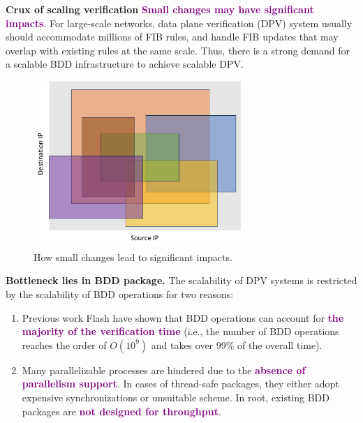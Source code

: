 \documentclass[final]{beamer}
\newcommand{\efsz}[1]{\textcolor{purple}{\textbf{#1}}}
\newlength{\colwidthB}
\begin{document}
\begin{frame}[t]
\begin{columns}
\begin{column}[T]{\colwidthB}
\begin{block}{\Large{\textbf{Crux of scaling verification}}}
    \efsz{Small changes may have significant impacts}. For large-scale
    networks, data plane verification (DPV) system usually should accommodate
    millions of FIB rules, and handle FIB updates that may overlap with existing rules
    at the same scale. Thus, there is a strong demand for a scalable BDD infrastructure 
    to achieve scalable DPV.

    \vspace{1cm}
      \begin{figure}
      \centering
      \includegraphics[width=0.7\textwidth]{figures/headerspace-split.pdf}
      \caption{How small changes lead to significant impacts.}
      \end{figure}
    \vspace{-1cm}

    \end{block}
  \begin{block}{\Large{\textbf{Bottleneck lies in BDD package.}}}
  \large
  The scalability of DPV systems is restricted by the scalability of BDD operations for two reasons: 

  \begin{enumerate}
    \item Previous work Flash have shown that BDD operations can account for 
    \efsz{the majority of the verification time}
    (i.e., the number of BDD operations reaches the order of $O(10^9)$ and 
    takes over 99\% of the overall time).

    \item Many parallelizable processes are hindered due to the \efsz{absence of parallelism support}.
    In cases of thread-safe packages, they either adopt expensive synchronizations or unsuitable
    scheme. In root, existing BDD packages are \efsz{not designed for throughput}.
  \end{enumerate}


\end{block}
\end{column}
\end{columns}
\end{frame}
\end{document}
